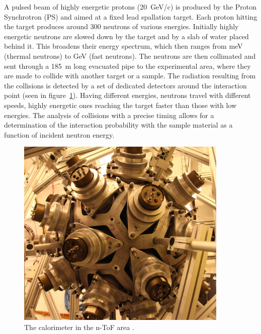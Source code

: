A pulsed beam of highly energetic protons (20~GeV/c) is produced by the Proton Synchrotron (PS) and aimed at a fixed lead spallation target. Each proton hitting the target produces around 300 neutrons of various energies. Initially highly energetic neutrons are slowed down by the target and by a slab of water placed behind it. This broadens their energy spectrum, which then ranges from meV (thermal neutrons) to GeV (fast neutrons). The neutrons are then collimated and sent through a 185~m long evacuated pipe to the experimental area, where they are made to collide with another target or a sample. The radiation resulting from the collisions is detected by a set of dedicated detectors around the interaction point (seen in figure~\ref{fig:ntof}). Having different energies, neutrons travel with different speeds, highly energetic ones reaching the target faster than those with low energies. The analysis of collisions with a precise timing allows for a determination of the interaction probability with the sample material as a function of incident neutron energy.
\begin{figure}[!t]
\centering
\includegraphics[width=0.9\textwidth]{01_introduction/pics/ntof}
\caption{The calorimeter in the n-ToF area \cite{Maximilien:1304589}.}
\label{fig:ntof}
\end{figure}


